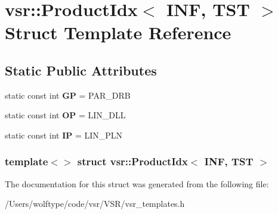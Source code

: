 \hypertarget{structvsr_1_1_product_idx_3_01_i_n_f_00_01_t_s_t_01_4}{\section{vsr\-:\-:Product\-Idx$<$ I\-N\-F, T\-S\-T $>$ Struct Template Reference}
\label{structvsr_1_1_product_idx_3_01_i_n_f_00_01_t_s_t_01_4}
}
\subsection*{Static Public Attributes}
\begin{DoxyCompactItemize}
\item 
\hypertarget{structvsr_1_1_product_idx_3_01_i_n_f_00_01_t_s_t_01_4_aa01134f32fb8d774fb7c4a6a810e3f27}{static const int {\bfseries G\-P} = P\-A\-R\-\_\-\-D\-R\-B}\label{structvsr_1_1_product_idx_3_01_i_n_f_00_01_t_s_t_01_4_aa01134f32fb8d774fb7c4a6a810e3f27}

\item 
\hypertarget{structvsr_1_1_product_idx_3_01_i_n_f_00_01_t_s_t_01_4_a0daa83a58bf00d20a5553abab8b7992b}{static const int {\bfseries O\-P} = L\-I\-N\-\_\-\-D\-L\-L}\label{structvsr_1_1_product_idx_3_01_i_n_f_00_01_t_s_t_01_4_a0daa83a58bf00d20a5553abab8b7992b}

\item 
\hypertarget{structvsr_1_1_product_idx_3_01_i_n_f_00_01_t_s_t_01_4_a639917e26d146146217c95ea671515d4}{static const int {\bfseries I\-P} = L\-I\-N\-\_\-\-P\-L\-N}\label{structvsr_1_1_product_idx_3_01_i_n_f_00_01_t_s_t_01_4_a639917e26d146146217c95ea671515d4}

\end{DoxyCompactItemize}
\subsubsection*{template$<$$>$ struct vsr\-::\-Product\-Idx$<$ I\-N\-F, T\-S\-T $>$}



The documentation for this struct was generated from the following file\-:\begin{DoxyCompactItemize}
\item 
/\-Users/wolftype/code/vsr/\-V\-S\-R/vsr\-\_\-templates.\-h\end{DoxyCompactItemize}
